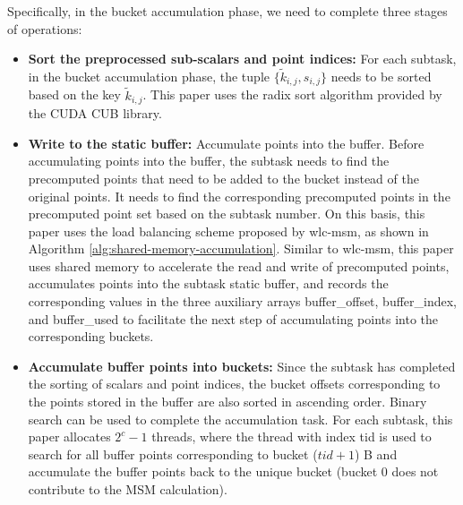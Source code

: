 \documentclass[journal=tches,final]{iacrtrans}
\begin{document}
Specifically, in the bucket accumulation phase, we need to complete three stages of operations:
\begin{itemize}
    \item \textbf{Sort the preprocessed sub-scalars and point indices:} For each subtask, in the bucket accumulation phase, the tuple $\{\widetilde{k}_{i,j}, s_{i,j}\}$ needs to be sorted based on the key $\widetilde{k}_{i,j}$. This paper uses the radix sort algorithm provided by the CUDA CUB library.
    \item \textbf{Write to the static buffer:} Accumulate points into the buffer. Before accumulating points into the buffer, the subtask needs to find the precomputed points that need to be added to the bucket instead of the original points. It needs to find the corresponding precomputed points in the precomputed point set based on the subtask number. On this basis, this paper uses the load balancing scheme proposed by wlc-msm, as shown in Algorithm \ref{alg:shared-memory-accumulation}. Similar to wlc-msm, this paper uses shared memory to accelerate the read and write of precomputed points, accumulates points into the subtask static buffer, and records the corresponding values in the three auxiliary arrays buffer\_offset, buffer\_index, and buffer\_used to facilitate the next step of accumulating points into the corresponding buckets.
    \item \textbf{Accumulate buffer points into buckets:} Since the subtask has completed the sorting of scalars and point indices, the bucket offsets corresponding to the points stored in the buffer are also sorted in ascending order. Binary search can be used to complete the accumulation task. For each subtask, this paper allocates $2^c-1$ threads, where the thread with index tid is used to search for all buffer points corresponding to bucket ($tid+1$) B and accumulate the buffer points back to the unique bucket (bucket 0 does not contribute to the MSM calculation).
\end{itemize}
\end{document}
